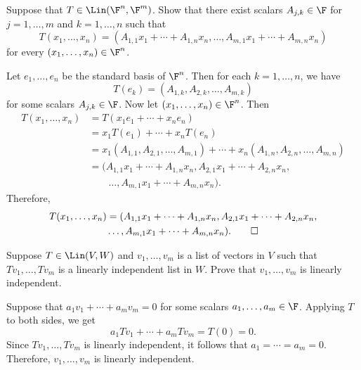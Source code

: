 \begin{exc}
\begin{exercise}
Suppose that $T\in\Lin(\F^n,\F^m)$. Show that there exist scalars
$A_{j,k}\in\F$ for $j=1,\dots,m$ and $k=1,\dots,n$ such that
\[ T(x_1,\dots,x_n)=(A_{1,1}x_1+\cdots+A_{1,n}x_n,\dots,
   A_{m,1}x_1+\cdots+A_{m,n}x_n) \]
for every $(x_1,\dots,x_n)\in\F^n$.
\end{exercise}
\begin{solution}
Let $e_1,\dots,e_n$ be the standard basis of $\F^n$. Then for each
$k=1,\dots,n$, we have
\[ T(e_k)=(A_{1,k},A_{2,k},\dots,A_{m,k}) \]
for some scalars $A_{j,k}\in\F$. Now let $(x_1,\dots,x_n)\in\F^n$. Then
\begin{align*}
T(x_1,\dots,x_n) &= T(x_1e_1+\cdots+x_ne_n)\\
  &= x_1T(e_1)+\cdots+x_nT(e_n)\\
  &= x_1(A_{1,1},A_{2,1},\dots,A_{m,1})+\cdots+x_n(A_{1,n},A_{2,n},\dots,A_{m,n})\\
  &= (A_{1,1}x_1+\cdots+A_{1,n}x_n,A_{2,1}x_1+\cdots+A_{2,n}x_n,\\
  &\qquad\dots,A_{m,1}x_1+\cdots+A_{m,n}x_n).
\end{align*}
Therefore,
\begin{multline*}
T(x_1,\dots,x_n)=(A_{1,1}x_1+\cdots+A_{1,n}x_n,A_{2,1}x_1+\cdots+A_{2,n}x_n,\\
  \dots,A_{m,1}x_1+\cdots+A_{m,n}x_n). \qedhere
\end{multline*}
\end{solution}

\begin{exercise}
Suppose $T\in\Lin(V,W)$ and $v_1,\dots,v_m$ is a list of vectors in $V$ such
that $Tv_1,\dots,Tv_m$ is a linearly independent list in $W$. Prove that
$v_1,\dots,v_m$ is linearly independent.
\end{exercise}
\begin{solution}
Suppose that $a_1v_1+\cdots+a_mv_m=0$ for some scalars $a_1,\dots,a_m\in\F$.
Applying $T$ to both sides, we get
\[ a_1Tv_1+\cdots+a_mTv_m=T(0)=0. \]
Since $Tv_1,\dots,Tv_m$ is linearly independent, it follows that
$a_1=\cdots=a_m=0$. Therefore, $v_1,\dots,v_m$ is linearly independent.
\end{solution}


\end{exc}
